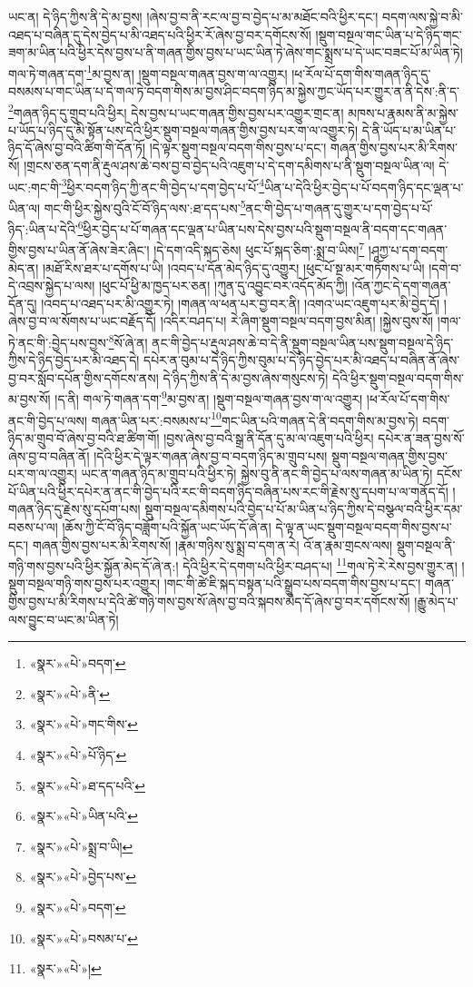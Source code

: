 ཡང་ན། དེ་ཉིད་ཀྱིས་ནི་དེ་མ་བྱས། །ཞེས་བྱ་བ་ནི་རང་ལ་བྱ་བ་བྱེད་པ་མ་མཐོང་བའི་ཕྱིར་དང་། བདག་ལས་སྐྱེ་བ་མི་འཐད་པ་བཞིན་དུ་དེས་བྱེད་པ་མི་འཐད་པའི་ཕྱིར་རོ་ཞེས་བྱ་བར་དགོངས་སོ། །སྡུག་བསྔལ་གང་ཡིན་པ་དེ་ཉིད་གང་ཟག་མ་ཡིན་པའི་ཕྱིར་དེས་བྱས་པ་ནི་གཞན་གྱིས་བྱས་པ་ཡང་ཡིན་ཏེ་ཞེས་གང་སྨྲས་པ་དེ་ཡང་བཟང་པོ་མ་ཡིན་ཏེ། གལ་ཏེ་གཞན་དག་\footnote{«སྣར་»«པེ་»བདག་}མ་བྱས་ན། །སྡུག་བསྔལ་གཞན་བྱས་ག་ལ་འགྱུར། །ཕ་རོལ་པོ་དག་གིས་གཞན་ཉིད་དུ་བསམས་པ་གང་ཡིན་པ་དེ་གལ་ཏེ་བདག་གིས་མ་བྱས་ཤིང་བདག་ཉིད་མ་སྐྱེས་ཀྱང་ཡོད་པར་གྱུར་ན་ནི་དེས་:ནི་ད་\footnote{«སྣར་»«པེ་»ནི་}གཞན་ཉིད་དུ་གྲུབ་པའི་ཕྱིར། དེས་བྱས་པ་ཡང་གཞན་གྱིས་བྱས་པར་འགྱུར་གྲང་ན། མཁས་པ་རྣམས་ནི་མ་སྐྱེས་པ་ཡོད་པ་ཉིད་དུ་མི་སྟོན་པས་དེའི་ཕྱིར་སྡུག་བསྔལ་གཞན་གྱིས་བྱས་པར་ག་ལ་འགྱུར་ཏེ། དེ་ནི་ཡོད་པ་མ་ཡིན་པ་ཉིད་དོ་ཞེས་བྱ་བའི་ཚིག་གི་དོན་ཏོ། །དེ་ལྟར་སྡུག་བསྔལ་བདག་གིས་བྱས་པ་དང་། གཞན་གྱིས་བྱས་པར་མི་རིགས་སོ། །གྲངས་ཅན་དག་ནི་རྡུལ་ཤས་ཆེ་བས་བྱ་བ་བྱེད་པའི་འཇུག་པ་དེ་དག་དམིགས་པ་ནི་སྡུག་བསྔལ་ཡིན་ལ། དེ་ཡང་:གང་གི་\footnote{«སྣར་»«པེ་»གང་གིས་}ཕྱིར་བདག་ཉིད་ཀྱི་ནང་གི་བྱེད་པ་དག་བྱེད་པ་པོ་\footnote{«སྣར་»«པེ་»པོ་ཉིད་}ཡིན་པ་དེའི་ཕྱིར་བྱེད་པ་པོ་བདག་ཉིད་དང་ལྡན་པ་ཡིན་ལ། གང་གི་ཕྱིར་སྐྱེས་བུའི་ངོ་བོ་ཉིད་ལས་:ཐ་དད་པས་\footnote{«སྣར་»«པེ་»ཐ་དད་པའི་}ནང་གི་བྱེད་པ་གཞན་དུ་གྱུར་པ་དག་བྱེད་པ་པོ་ཉིད་:ཡིན་པ་དེའི་\footnote{«སྣར་»«པེ་»ཡིན་པའི་}ཕྱིར་བྱེད་པ་པོ་གཞན་དང་ལྡན་པ་ཡིན་པས་དེས་བྱས་པའི་སྡུག་བསྔལ་ནི་བདག་དང་གཞན་གྱིས་བྱས་པ་ཡིན་ནོ་ཞེས་ཟེར་ཞིང་། །དེ་དག་འདི་སྐད་ཅེས། ཕུང་པོ་སྐད་ཅིག་:སྨྲ་བ་ཡིས།\footnote{«སྣར་»«པེ་»སྨྲ་བ་ཡི།} །ཤཱཀྱ་པ་དག་བདག་མེད་ན། །མཐོ་རིས་ཐར་པ་དགོས་པ་ཡི། །འབད་པ་དོན་མེད་ཉིད་དུ་འགྱུར། །ཕུང་པོ་སྔ་མར་གཏོགས་པ་ཡི། །དགེ་བ་དེ་འབྲས་སྐྱེད་པ་ལས། །ཕུང་པོ་ཕྱི་མ་ཁྱད་པར་ཅན། །ཀུན་དུ་འབྱུང་བར་འདོད་མོད་ཀྱི། །འོན་ཀྱང་དེ་དག་གཞན་དོན་དུ། །འབད་པ་འཐད་པར་མི་འགྱུར་ཏེ། །གཞན་ལ་ཕན་པར་བྱ་བར་ནི། །འགའ་ཡང་འཇུག་པར་མི་བྱེད་དོ། །ཞེས་བྱ་བ་ལ་སོགས་པ་ཡང་བརྗོད་དོ། །འདིར་བཤད་པ། རེ་ཞིག་སྡུག་བསྔལ་བདག་བྱས་མིན། །སྐྱེས་བུས་སོ། །གལ་ཏེ་ནང་གི་:བྱེད་པས་བྱས་\footnote{«སྣར་»«པེ་»བྱེད་པས་}སོ་ཞེ་ན། ནང་གི་བྱེད་པ་རྡུལ་ཤས་ཆེ་བ་དེ་ནི་སྡུག་བསྔལ་ཡིན་པས་སྡུག་བསྔལ་དེ་ཉིད་ཀྱིས་དེ་ཉིད་བྱེད་པར་མི་འཐད་དེ། དཔེར་ན་བུམ་པ་དེ་ཉིད་ཀྱིས་བུམ་པ་དེ་ཉིད་བྱེད་པར་མི་འཐད་པ་བཞིན་ནོ་ཞེས་བྱ་བར་སློབ་དཔོན་གྱིས་དགོངས་ནས། དེ་ཉིད་ཀྱིས་ནི་དེ་མ་བྱས་ཞེས་གསུངས་ཏེ། དེའི་ཕྱིར་སྡུག་བསྔལ་བདག་གིས་མ་བྱས་སོ། །ད་ནི། གལ་ཏེ་གཞན་དག་\footnote{«སྣར་»«པེ་»བདག་}མ་བྱས་ན། །སྡུག་བསྔལ་གཞན་བྱས་ག་ལ་འགྱུར། །ཕ་རོལ་པོ་དག་གིས་ནང་གི་བྱེད་པ་ལས། གཞན་ཡིན་པར་:བསམས་པ་\footnote{«སྣར་»«པེ་»བསམ་པ་}གང་ཡིན་པའི་གཞན་དེ་ནི་བདག་གིས་མ་བྱས་ཏེ། བདག་ཉིད་མ་གྲུབ་བོ་ཞེས་བྱ་བའི་ཐ་ཚིག་གོ། །བྱས་ཞེས་བྱ་བའི་སྒྲ་ནི་དོན་དུ་མ་ལ་འཇུག་པའི་ཕྱིར། དཔེར་ན་ཟན་བྱས་སོ་ཞེས་བྱ་བ་བཞིན་ནོ། །དེའི་ཕྱིར་དེ་ལྟར་གཞན་ཞེས་བྱ་བ་བདག་ཉིད་མ་གྲུབ་པས། སྡུག་བསྔལ་གཞན་གྱིས་བྱས་པར་ག་ལ་འགྱུར། ཡང་ན་གཞན་ཉིད་མ་གྲུབ་པའི་ཕྱིར་ཏེ། སྐྱེས་བུ་ནི་ནང་གི་བྱེད་པ་ལས་གཞན་མ་ཡིན་ཏེ། དངོས་པོ་ཡིན་པའི་ཕྱིར་དཔེར་ན་ནང་གི་བྱེད་པའི་རང་གི་བདག་ཉིད་བཞིན་པས་རང་གི་རྗེས་སུ་དཔག་པ་ལ་གནོད་དོ། །གཞན་ཉིད་དུ་རྗེས་སུ་དཔོག་པས། སྡུག་བསྔལ་དམིགས་པའི་བྱེད་པ་པོ་མ་ཡིན་པ་ཉིད་ཀྱིས་དེ་བསྩལ་བའི་ཕྱིར་དམ་བཅས་པ་ལ། །ཆོས་ཀྱི་ངོ་བོ་ཉིད་བཟློག་པའི་སྐྱོན་ཡང་ཡོད་དོ་ཞེ་ན། དེ་ལྟ་ན་ཡང་སྡུག་བསྔལ་བདག་གིས་བྱས་པ་དང་། གཞན་གྱིས་བྱས་པར་མི་རིགས་སོ། །རྣམ་གཉིས་སུ་སྨྲ་བ་དག་ན་རེ། འོ་ན་རྣམ་གྲངས་ལས། སྡུག་བསྔལ་ནི་གཉི་གས་བྱས་པའི་ཕྱིར་སྐྱོན་མེད་དོ་ཞེ་ན:། དེའི་ཕྱིར་དེ་དགག་པའི་ཕྱིར་བཤད་པ། \footnote{«སྣར་»«པེ་»།  }གལ་ཏེ་རེ་རེས་བྱས་གྱུར་ན། །སྡུག་བསྔལ་གཉི་གས་བྱས་པར་འགྱུར། །གང་གི་ཚེ་ཇི་སྐད་བསྟན་པའི་སྒྲུབ་པས་བདག་གིས་བྱས་པ་དང་། གཞན་གྱིས་བྱས་པ་མི་རིགས་པ་དེའི་ཚེ་གཉི་གས་བྱས་སོ་ཞེས་བྱ་བའི་སྐབས་མེད་དོ་ཞེས་བྱ་བར་དགོངས་སོ། །རྒྱུ་མེད་པ་ལས་བྱུང་བ་ཡང་མ་ཡིན་ཏེ། 